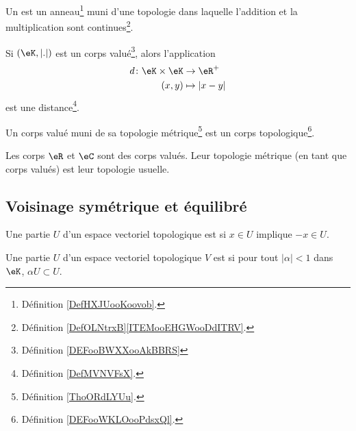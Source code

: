 \begin{definition}      \label{DEFooWKLOooPdsxQl}
	Un  est un anneau\footnote{Définition \ref{DefHXJUooKoovob}.} muni d'une topologie dans laquelle l'addition et la multiplication sont continues\footnote{Définition \ref{DefOLNtrxB}\ref{ITEMooEHGWooDdITRV}.}.
\end{definition}

\begin{propositionDef}      \label{PROPooAWAKooKRmbGT}
	Si \( (\eK, | . |)\) est un corps valué\footnote{Définition \ref{DEFooBWXXooAkBBRS}}, alors l'application
	\begin{equation}
		\begin{aligned}
			d\colon \eK\times \eK & \to \eR^+       \\
			(x,y)                 & \mapsto | x-y |
		\end{aligned}
	\end{equation}
	est une distance\footnote{Définition \ref{DefMVNVFsX}.}.

	Un corps valué muni de sa topologie métrique\footnote{Définition \ref{ThoORdLYUu}.} est un corps topologique\footnote{Définition \ref{DEFooWKLOooPdsxQl}.}.
\end{propositionDef}

\begin{lemma}       \label{LEMooCHDTooZsgXEK}
	Les corps \( \eR\) et \( \eC\) sont des corps valués. Leur topologie métrique (en tant que corps valués) est leur topologie usuelle.
\end{lemma}

\subsection{Voisinage symétrique et équilibré}

\begin{definition}
	Une partie \( U\) d'un espace vectoriel topologique est  si \( x\in U\) implique \( -x\in U\).
\end{definition}

\begin{definition}
	Une partie \( U\) d'un espace vectoriel topologique \( V\) est  si pour tout \( | \alpha |<1\) dans \( \eK\), \( \alpha U\subset U\).
\end{definition}

